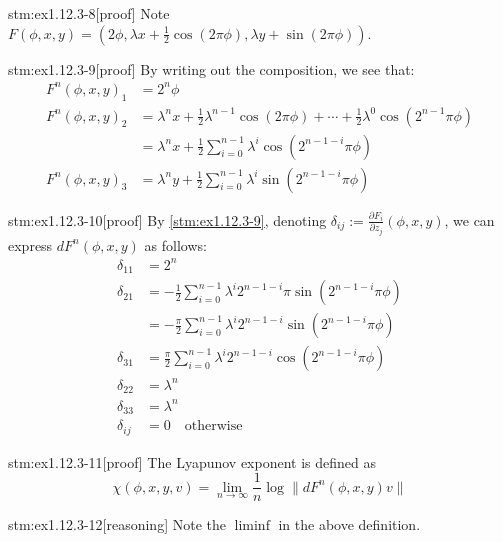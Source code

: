 \begin{stm}{stm:ex1.12.3-8}[proof]
Note $F(\phi, x, y) = (2\phi, \lambda x + \frac{1}{2} \cos(2\pi\phi), \lambda y + \sin(2\pi\phi))$.
\end{stm}

\begin{stm}{stm:ex1.12.3-9}[proof]
By writing out the composition, we see that:
\begin{align*}
F^n(\phi, x, y)_1 &= 2^n \phi \\
F^n(\phi, x, y)_2 &= \lambda^n x + \frac{1}{2} \lambda^{n-1} \cos(2\pi \phi) + \cdots + \frac{1}{2} \lambda^0 \cos(2^{n-1} \pi \phi) \\
&= \lambda^n x + \frac{1}{2} \sum_{i=0}^{n-1} \lambda^i \cos(2^{n-1-i} \pi \phi) \\
F^n(\phi, x, y)_3 &= \lambda^n y + \frac{1}{2} \sum_{i=0}^{n-1} \lambda^i \sin(2^{n-1-i} \pi \phi)
\end{align*}
\end{stm}


\begin{stm}{stm:ex1.12.3-10}[proof]
By \ref{stm:ex1.12.3-9}, denoting $\delta_{ij} := \frac{\partial F_i}{\partial z_j}(\phi, x, y)$, we can express $dF^n(\phi, x, y)$ as follows:
\begin{align*}
\delta_{11} &= 2^n \\
\delta_{21} &= -\frac{1}{2} \sum_{i=0}^{n-1} \lambda^i 2^{n-1-i} \pi \sin(2^{n-1-i} \pi \phi) \\
&= -\frac{\pi}{2} \sum_{i=0}^{n-1} \lambda^i 2^{n-1-i} \sin(2^{n-1-i} \pi \phi) \\
\delta_{31} &= \frac{\pi}{2} \sum_{i=0}^{n-1} \lambda^i 2^{n-1-i} \cos(2^{n-1-i} \pi \phi) \\
\delta_{22} &= \lambda^n \\
\delta_{33} &= \lambda^n \\
\delta_{ij} &= 0 \quad \text{otherwise}
\end{align*}
\end{stm}


\begin{stm}{stm:ex1.12.3-11}[proof]
The Lyapunov exponent is defined as
\[
\chi(\phi, x, y, v) = \lim_{n \to \infty} \frac{1}{n} \log \| dF^n(\phi, x, y)v \|
\]
\end{stm}

\begin{stm}{stm:ex1.12.3-12}[reasoning]
Note the $\liminf$ in the above definition.
\end{stm}

